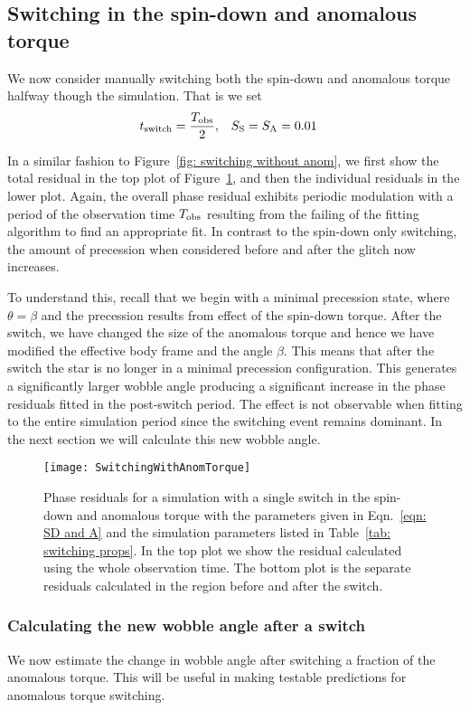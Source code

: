 \documentclass[../full_thesis/full_thesis.tex]{subfiles}
\begin{document}
\subsection{Switching in the spin-down and anomalous torque}
We now consider manually switching both the spin-down and anomalous torque
halfway though the simulation.  That is we set
\begin{align}
    t_{\mathrm{switch}} = \frac{T_{\mathrm{obs}}}{2}, &&& S_{\mathrm{S}} = S_{\mathrm{A}} = 0.01
\label{eqn: SD and A}
\end{align}

In a similar fashion to Figure~\ref{fig: switching without anom}, we first show
the total residual in the top plot of Figure~\ref{fig: switching with anom}, and
then the individual residuals in the lower plot. Again, the overall phase
residual exhibits periodic modulation with a period of the observation time $T_{\mathrm{obs}}$
resulting from the failing of the fitting algorithm to find an appropriate fit.
In contrast to the spin-down only switching, the amount of precession when
considered before and after the glitch now increases.

To understand this, recall that we begin with a minimal precession state, where
$\theta = \beta$ and the precession results from effect of the spin-down
torque.  After the switch, we have changed the size of the anomalous torque and
hence we have modified the effective body frame and the angle $\beta$. This
means that after the switch the star is no longer in a minimal
precession configuration.
This generates a significantly larger wobble angle producing a significant
increase in the phase residuals fitted in the post-switch period. The effect is
not observable when fitting to the entire simulation period since the switching
event remains dominant. In the next section we will calculate this new wobble
angle.
\begin{figure}[htb]
\texttt{[image: SwitchingWithAnomTorque]}
\caption{Phase residuals for a simulation with a single switch in the spin-down
and anomalous torque with the parameters given in Eqn.~\eqref{eqn: SD and A}
and the simulation parameters listed in Table~\ref{tab: switching props}. In
the top plot we show the residual calculated using the whole observation time.
The bottom plot is the separate residuals calculated in the region before
and after the switch.}
\label{fig: switching with anom}
\end{figure}

\subsubsection{Calculating the new wobble angle after a switch}
We now estimate the change in wobble angle after switching a fraction of the
anomalous torque. This will be useful in making testable predictions for
anomalous torque switching.
\end{document}
